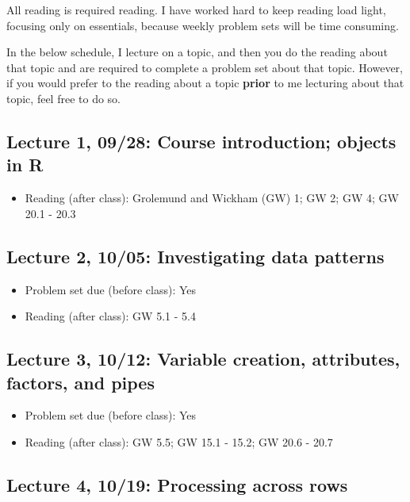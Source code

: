 \documentclass[11pt,]{article}
\providecommand{\tightlist}{%
  \setlength{\itemsep}{0pt}\setlength{\parskip}{0pt}}
\begin{document}
All reading is required reading. I have worked hard to keep reading load
light, focusing only on essentials, because weekly problem sets will be
time consuming.

In the below schedule, I lecture on a topic, and then you do the reading
about that topic and are required to complete a problem set about that
topic. However, if you would prefer to the reading about a topic
\textbf{prior} to me lecturing about that topic, feel free to do so.

\subsection{Lecture 1, 09/28: Course introduction; objects in
R}\label{lecture-1-0928-course-introduction-objects-in-r}

\begin{itemize}
\tightlist
\item
  Reading (after class): Grolemund and Wickham (GW) 1; GW 2; GW 4; GW
  20.1 - 20.3
\end{itemize}

\subsection{Lecture 2, 10/05: Investigating data
patterns}\label{lecture-2-1005-investigating-data-patterns}

\begin{itemize}
\tightlist
\item
  Problem set due (before class): Yes
\item
  Reading (after class): GW 5.1 - 5.4
\end{itemize}

\subsection{Lecture 3, 10/12: Variable creation, attributes, factors,
and
pipes}\label{lecture-3-1012-variable-creation-attributes-factors-and-pipes}

\begin{itemize}
\tightlist
\item
  Problem set due (before class): Yes
\item
  Reading (after class): GW 5.5; GW 15.1 - 15.2; GW 20.6 - 20.7
\end{itemize}

\subsection{Lecture 4, 10/19: Processing across
rows}\label{lecture-4-1019-processing-across-rows}
\end{document}
